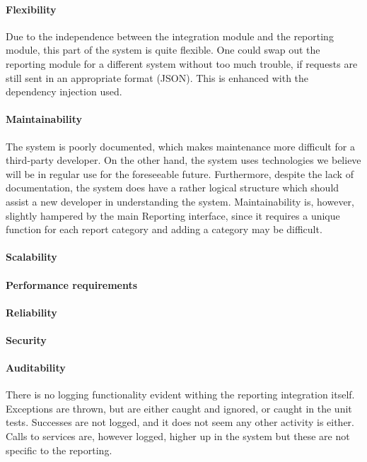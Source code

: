 \documentclass{article}
\begin{document}
            \paragraph{Flexibility}
            Due to the independence between the integration module and the reporting module, this part of the system is quite flexible. One could swap out the reporting module for a different system without too much trouble, if requests are still sent in an appropriate format (JSON). This is enhanced with the dependency injection used.
            \paragraph{Maintainability}
            The system is poorly documented, which makes maintenance more difficult for a third-party developer. On the other hand, the system uses technologies we believe will be in regular use for the foreseeable future. Furthermore, despite the lack of documentation, the system does have a rather logical structure which should assist a new developer in understanding the system. Maintainability is, however, slightly hampered by the main Reporting interface, since it requires a unique function for each report category and adding a category may be difficult.
            \paragraph{Scalability}
            \paragraph{Performance requirements}
            \paragraph{Reliability}
            \paragraph{Security}
            \paragraph{Auditability}
            There is no logging functionality evident withing the reporting integration itself. Exceptions are thrown, but are either caught and ignored, or caught in the unit tests. Successes are not logged, and it does not seem any other activity is either. Calls to services are, however logged, higher up in the system but these are not specific to the reporting.
\end{document}
